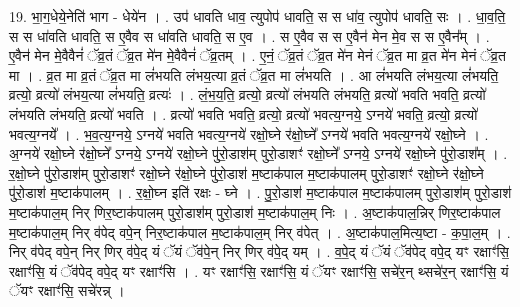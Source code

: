 \documentclass[17pt]{extarticle}
\begin{document}
19. भा॒ग॒धेये॒नेति॑ भाग - धेये॑न । . उप॑ धावति धाव॒ त्युपोप॑ धावति॒ स स धा॑व॒ त्युपोप॑ धावति॒ सः । . धा॒व॒ति॒ स स धा॑वति धावति॒ स ए॒वैव स धा॑वति धावति॒ स ए॒व । . स ए॒वैव स स ए॒वैन॑ मेन मे॒व स स ए॒वैन᳚म् । . ए॒वैन॑ मेन मे॒वैवैनं॑ ॅव्र॒तं ॅव्र॒त मे॑न मे॒वैवैनं॑ ॅव्र॒तम् । . ए॒नं॒ ॅव्र॒तं ॅव्र॒त मे॑न मेनं ॅव्र॒त मा व्र॒त मे॑न मेनं ॅव्र॒त मा । . व्र॒त मा व्र॒तं ॅव्र॒त मा लं॑भयति लंभय॒त्या व्र॒तं ॅव्र॒त मा लं॑भयति । . आ लं॑भयति लंभय॒त्या लं॑भयति॒ व्रत्यो॒ व्रत्यो॑ लंभय॒त्या लं॑भयति॒ व्रत्यः॑ । . लं॒भ॒य॒ति॒ व्रत्यो॒ व्रत्यो॑ लंभयति लंभयति॒ व्रत्यो॑ भवति भवति॒ व्रत्यो॑ लंभयति लंभयति॒ व्रत्यो॑ भवति । . व्रत्यो॑ भवति भवति॒ व्रत्यो॒ व्रत्यो॑ भवत्य॒ग्नये॒ ऽग्नये॑ भवति॒ व्रत्यो॒ व्रत्यो॑ भवत्य॒ग्नये᳚ । . भ॒व॒त्य॒ग्नये॒ ऽग्नये॑ भवति भवत्य॒ग्नये॑ रक्षो॒घ्ने र॑क्षो॒घ्ने᳚ ऽग्नये॑ भवति भवत्य॒ग्नये॑ रक्षो॒घ्ने । . अ॒ग्नये॑ रक्षो॒घ्ने र॑क्षो॒घ्ने᳚ ऽग्नये॒ ऽग्नये॑ रक्षो॒घ्ने पु॑रो॒डाश॑म् पुरो॒डाशꣳ॑ रक्षो॒घ्ने᳚ ऽग्नये॒ ऽग्नये॑ रक्षो॒घ्ने पु॑रो॒डाश᳚म् । . र॒क्षो॒घ्ने पु॑रो॒डाश॑म् पुरो॒डाशꣳ॑ रक्षो॒घ्ने र॑क्षो॒घ्ने पु॑रो॒डाश॑ म॒ष्टाक॑पाल म॒ष्टाक॑पालम् पुरो॒डाशꣳ॑ रक्षो॒घ्ने र॑क्षो॒घ्ने पु॑रो॒डाश॑ म॒ष्टाक॑पालम् । . र॒क्षो॒घ्न इति॑ रक्षः - घ्ने । . पु॒रो॒डाश॑ म॒ष्टाक॑पाल म॒ष्टाक॑पालम् पुरो॒डाश॑म् पुरो॒डाश॑ म॒ष्टाक॑पाल॒म् निर् णिर॒ष्टाक॑पालम् पुरो॒डाश॑म् पुरो॒डाश॑ म॒ष्टाक॑पाल॒म् निः । . अ॒ष्टाक॑पाल॒न्निर् णिर॒ष्टाक॑पाल म॒ष्टाक॑पाल॒म् निर् व॑पेद् वपे॒न् निर॒ष्टाक॑पाल म॒ष्टाक॑पाल॒म् निर् व॑पेत् । . अ॒ष्टाक॑पाल॒मित्य॒ष्टा - क॒पा॒ल॒म् । . निर् व॑पेद् वपे॒न् निर् णिर् व॑पे॒द् यं ॅयं ॅव॑पे॒न् निर् णिर् व॑पे॒द् यम् । . व॒पे॒द् यं ॅयं ॅव॑पेद् वपे॒द् यꣳ रक्षाꣳ॑सि॒ रक्षाꣳ॑सि॒ यं ॅव॑पेद् वपे॒द् यꣳ रक्षाꣳ॑सि । . यꣳ रक्षाꣳ॑सि॒ रक्षाꣳ॑सि॒ यं ॅयꣳ रक्षाꣳ॑सि॒ सचे॑र॒न् थ्सचे॑र॒न् रक्षाꣳ॑सि॒ यं ॅयꣳ रक्षाꣳ॑सि॒ सचे॑रन्न् । \newline
\end{document}
